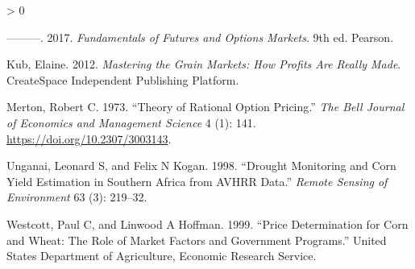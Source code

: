 \documentclass[
]{book}
\newlength{\cslhangindent}
\newenvironment{CSLReferences}[2] %
 {%
  \setlength{\parindent}{0pt}
  \ifodd #1 \everypar{\setlength{\hangindent}{\cslhangindent}}\ignorespaces\fi
  \ifnum #2 > 0
  \setlength{\parskip}{#2\baselineskip}
  \fi
 }%
 {}
\begin{document}
\begin{CSLReferences}{1}{0}
\leavevmode\hypertarget{ref-hull2017fundamentals}{}%
---------. 2017. \emph{Fundamentals of Futures and Options Markets}. 9th ed. Pearson.

\leavevmode\hypertarget{ref-kub2012Mastering}{}%
Kub, Elaine. 2012. \emph{Mastering the Grain Markets: How Profits Are Really Made}. CreateSpace Independent Publishing Platform.

\leavevmode\hypertarget{ref-merton1973}{}%
Merton, Robert C. 1973. {``Theory of Rational Option Pricing.''} \emph{The Bell Journal of Economics and Management Science} 4 (1): 141. \url{https://doi.org/10.2307/3003143}.

\leavevmode\hypertarget{ref-unganai1998drought}{}%
Unganai, Leonard S, and Felix N Kogan. 1998. {``Drought Monitoring and Corn Yield Estimation in Southern Africa from AVHRR Data.''} \emph{Remote Sensing of Environment} 63 (3): 219--32.

\leavevmode\hypertarget{ref-westcott1999price}{}%
Westcott, Paul C, and Linwood A Hoffman. 1999. {``Price Determination for Corn and Wheat: The Role of Market Factors and Government Programs.''} United States Department of Agriculture, Economic Research Service.

\end{CSLReferences}
\end{document}
